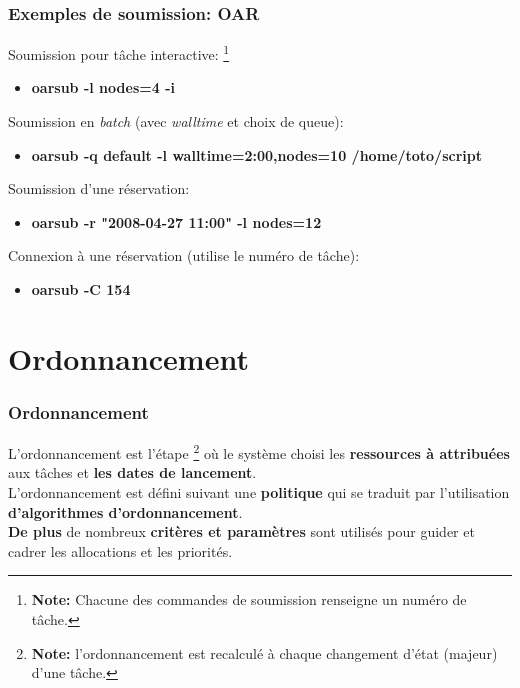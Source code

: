 \documentclass{beamer}
\begin{document}
\begin{frame}
	\frametitle{Exemples de soumission: OAR}
	
Soumission pour tâche interactive: \footnote{{\bf Note:} Chacune des commandes de soumission renseigne un numéro de tâche.}

		\begin{itemize}
			\item	{\bf oarsub -l nodes=4 -i}
		\end{itemize}

	Soumission en {\em batch} (avec {\em walltime} et choix de queue):
		\begin{itemize}
			\item	{\bf oarsub -q default -l walltime=2:00,nodes=10 /home/toto/script}
		\end{itemize}

	Soumission d'une réservation:
		\begin{itemize}
			\item	{\bf oarsub -r "2008-04-27 11:00" -l nodes=12}
		\end{itemize}

	Connexion à une réservation (utilise le numéro de tâche):
		\begin{itemize}
			\item	{\bf oarsub -C 154}
		\end{itemize}


\end{frame}

\section{Ordonnancement}


\begin{frame}
	\frametitle{Ordonnancement}
	
	L'ordonnancement est l'étape \footnote{{\bf Note:} l'ordonnancement est recalculé à chaque changement d'état (majeur) d'une tâche.}
où le système choisi les {\bf ressources à attribuées} aux tâches et {\bf les dates de lancement}.
\\[0.4cm]
	L'ordonnancement est défini suivant une {\bf politique} qui se traduit par l'utilisation {\bf d'algorithmes d'ordonnancement}.
\\[0.4cm]
	{\bf De plus} de nombreux {\bf critères et paramètres} sont utilisés pour guider et cadrer les allocations et les priorités.
 

\end{frame}
\end{document}
